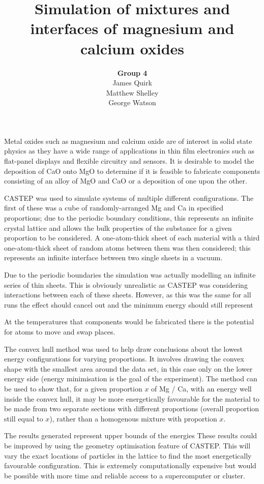 \documentclass[a4paper,12pt]{article}
\title{Simulation of mixtures and interfaces of magnesium and calcium oxides}
\author{\textbf{Group 4}\\
	James Quirk\\
	Matthew Shelley\\
	George Watson}
\date{}
\begin{document}
\begin{multicols}{2}
	\maketitle
	
	Metal oxides such as magnesium and calcium oxide are of interest in solid state physics as they have a wide range of applications in thin film electronics such as flat-panel displays and flexible circuitry and sensors.\cite{kim2011lowtemperature} It is desirable to model the deposition of CaO onto MgO to determine if it is feasible to fabricate components consisting of an alloy of MgO and CaO or a deposition of one upon the other.
	
	CASTEP\cite{clark2009first} was used to simulate systems of multiple different configurations. The first of these was a cube of randomly-arranged Mg and Ca in specified proportions; due to the periodic boundary conditions, this represents an infinite crystal lattice and allows the bulk properties of the substance for a given proportion to be considered. A one-atom-thick sheet of each material with a third one-atom-thick sheet of random atoms between them was then considered; this represents an infinite interface between two single sheets in a vacuum.
	
	Due to the periodic boundaries the simulation was actually modelling an infinite series of thin sheets. This is obviously unrealistic as CASTEP was considering interactions between each of these sheets. However, as this was the same for all runs the effect should cancel out and the minimum energy should still represent 
	
	At the temperatures that components would be fabricated there is the potential for atoms to move and swap places.
	
	The convex hull method\cite{jarvis1973identification} was used to help draw conclusions about the lowest energy configurations for varying proportions. It involves drawing the convex shape with the smallest area around the data set, in this case only on the lower energy side (energy minimisation is the goal of the experiment). The method can be used to show that, for a given proportion $x$ of Mg / Ca, with an energy well inside the convex hull, it may be more energetically favourable for the material to be made from two separate sections with different proportions (overall proportion still equal to $x$), rather than a homogenous mixture with proportion $x$.
	

	The results generated represent upper bounds of the energies These results could be improved by using the geometry optimisation feature of CASTEP. This will vary the exact locations of particles in the lattice to find the most energetically favourable configuration. This is extremely computationally expensive but would be possible with more time and reliable access to a supercomputer or cluster.
	


\end{multicols}
\end{document}
